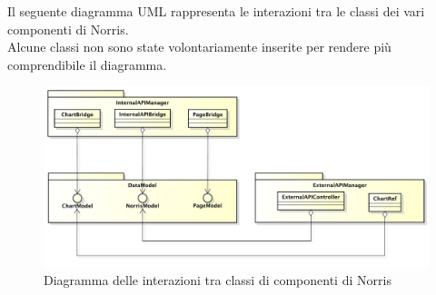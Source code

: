 	Il seguente diagramma UML rappresenta le interazioni tra le classi dei vari componenti di Norris.\\
	Alcune classi non sono state volontariamente inserite per rendere più comprendibile il diagramma.
	\begin{figure}[H]\centering
		\includegraphics[width=\textwidth]{SpecificaTecnica/Pics/InterazioniComponentiNorris.pdf}
		\caption{Diagramma delle interazioni tra classi di componenti di Norris}
	\end{figure}
